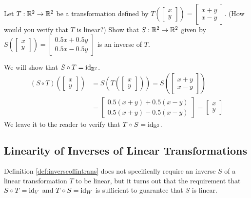 \documentclass{ximera}
\begin{document}
\begin{example}\label{ex:inverseverify} Let $T:\mathbb{R}^2\rightarrow \mathbb{R}^2$ be a transformation defined by $T\left(\begin{bmatrix}x\\y\end{bmatrix}\right)=\begin{bmatrix}x+y\\x-y\end{bmatrix}$. (How would you verify that $T$ is linear?)  Show that $S:\mathbb{R}^2\rightarrow \mathbb{R}^2$ given by $S\left(\begin{bmatrix}x\\y\end{bmatrix}\right)=\begin{bmatrix}0.5x+0.5y\\0.5x-0.5y\end{bmatrix}$ is an inverse of $T$.
\begin{explanation}
We will show that $S\circ T=\text{id}_{\mathbb{R}^2}$.  
\begin{align*}
(S\circ T)\left(\begin{bmatrix}x\\y\end{bmatrix}\right)&=S\left(T\left(\begin{bmatrix}x\\y\end{bmatrix}\right)\right)=S\left(\begin{bmatrix}x+y\\x-y\end{bmatrix}\right)\\
&=\begin{bmatrix}0.5(x+y)+0.5(x-y)\\0.5(x+y)-0.5(x-y)\end{bmatrix}
=\begin{bmatrix}x\\y\end{bmatrix}
\end{align*}
We leave it to the reader to verify that $T\circ S=\text{id}_{\mathbb{R}^2}$.

\end{explanation}
\end{example}

\subsection*{Linearity of Inverses of Linear Transformations}

Definition \ref{def:inverseoflintrans} does not specifically require an inverse $S$ of a linear transformation $T$ to be linear, but it turns out that the requirement that $S\circ T=\text{id}_V$ and $T\circ S=\text{id}_W$ is sufficient to guarantee that $S$ is linear.  
\end{document}
